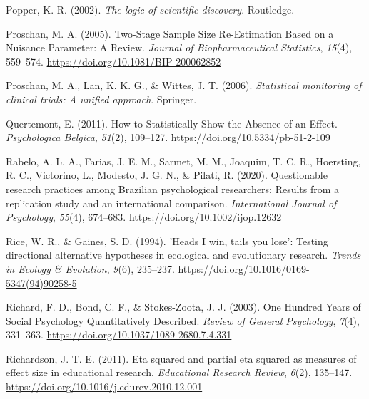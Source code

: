 \documentclass[
  letterpaper,
  DIV=11,
  numbers=noendperiod]{scrreprt}
\newlength{\cslhangindent}
\newlength{\cslentryspacingunit} %
\newenvironment{CSLReferences}[2] %
 {%
  \setlength{\parindent}{0pt}
  \ifodd #1
  \let\oldpar\par
  \def\par{\hangindent=\cslhangindent\oldpar}
  \fi
  \setlength{\parskip}{#2\cslentryspacingunit}
 }%
 {}
\begin{document}
\begin{CSLReferences}{1}{0}
\leavevmode{}%
Popper, K. R. (2002). \emph{{The logic of scientific discovery}}.
{Routledge}.

\leavevmode{}%
Proschan, M. A. (2005). Two-{Stage Sample Size Re-Estimation Based} on a
{Nuisance Parameter}: {A Review}. \emph{Journal of Biopharmaceutical
Statistics}, \emph{15}(4), 559--574.
\url{https://doi.org/10.1081/BIP-200062852}

\leavevmode{}%
Proschan, M. A., Lan, K. K. G., \& Wittes, J. T. (2006).
\emph{Statistical monitoring of clinical trials: A unified approach}.
{Springer}.

\leavevmode{}%
Quertemont, E. (2011). How to {Statistically Show} the {Absence} of an
{Effect}. \emph{Psychologica Belgica}, \emph{51}(2), 109--127.
\url{https://doi.org/10.5334/pb-51-2-109}

\leavevmode{}%
Rabelo, A. L. A., Farias, J. E. M., Sarmet, M. M., Joaquim, T. C. R.,
Hoersting, R. C., Victorino, L., Modesto, J. G. N., \& Pilati, R.
(2020). Questionable research practices among {Brazilian} psychological
researchers: {Results} from a replication study and an international
comparison. \emph{International Journal of Psychology}, \emph{55}(4),
674--683. \url{https://doi.org/10.1002/ijop.12632}

\leavevmode{}%
Rice, W. R., \& Gaines, S. D. (1994). '{Heads I} win, tails you lose':
Testing directional alternative hypotheses in ecological and
evolutionary research. \emph{Trends in Ecology \& Evolution},
\emph{9}(6), 235--237.
\url{https://doi.org/10.1016/0169-5347(94)90258-5}

\leavevmode{}%
Richard, F. D., Bond, C. F., \& Stokes-Zoota, J. J. (2003). One {Hundred
Years} of {Social Psychology Quantitatively Described}. \emph{Review of
General Psychology}, \emph{7}(4), 331--363.
\url{https://doi.org/10.1037/1089-2680.7.4.331}

\leavevmode{}%
Richardson, J. T. E. (2011). Eta squared and partial eta squared as
measures of effect size in educational research. \emph{Educational
Research Review}, \emph{6}(2), 135--147.
\url{https://doi.org/10.1016/j.edurev.2010.12.001}


\end{CSLReferences}
\end{document}

